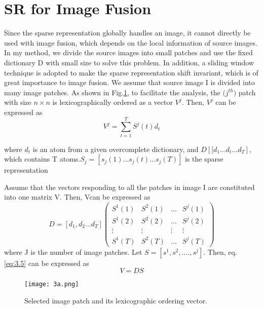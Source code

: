 \section{SR for Image Fusion} 

Since the sparse representation globally handles an image,
it cannot directly be used with image fusion, which depends
on the local information of source images. In my method, we
divide the source images into small patches and use the fixed
dictionary D with small size to solve this problem. In addition,
a sliding window technique is adopted to make the sparse
representation shift invariant, which is of great importance to
image fusion.
\hfill \break
We assume that source image I is divided into many image
patches. As shown in Fig.\ref{fig3.1}, to facilitate the analysis, the $\big(j^{th} \big) $ patch with size $ n×n $ is lexicographically ordered as a vector \({V}^{j}\). Then, \({V}^{j}\) can be expressed as
\begin{equation}
{V}^{j}=\sum_{t=1}^{T} {S}^{j} \left(t\right){d}_{t}
\end{equation}

where \({d}_{t}\) is an atom from a given overcomplete dictionary, and \(D\left[[{d}_{1} \dots{} {d}_{t} \dots{} {d}_{T} \right]\), which contains T atoms.\({S}_{j} = [{s}_{j}\left(1\right) \dots{} {s}_{j}\left( t\right) \dots{} {s}_{j}(T)]\)
 is the sparse representation

Assume that the vectors responding to all the patches in
image I are constituted into one matrix V. Then, Vcan be
expressed as 
\begin{equation}\label{eq:3.5}
D= \left[{d}_{1},{d}_{2} \dots{} {d}_{T}\right] \begin{pmatrix}
{S}^{1}(1) & {S}^{2}(1) & \dots{} & {S}^{j}(1) \\ 
 {S}^{1}(2)& {S}^{2}(2) & \dots{}  & {S}^{j}(2) \\ 
 \vdots{}& \vdots{}  &  \vdots{} & \vdots{}   \\ 
 {S}^{1}(T)& {S}^{2}(T) &  \dots{} & {S}^{j}(T) 
\end{pmatrix}
\end{equation}
where J is the number of image patches. Let \(S=[{s}^{1},{s}^{2},....,{s}^{j}]\). Then, eq. \ref{eq:3.5} can be expressed as 
\begin{equation}
V=DS
\end{equation}

\begin{figure}[h]
  \centering
  \texttt{[image: 3a.png]}
  \label{fig3.1}
  \caption{Selected image patch and its lexicographic ordering vector.}
\end{figure}

